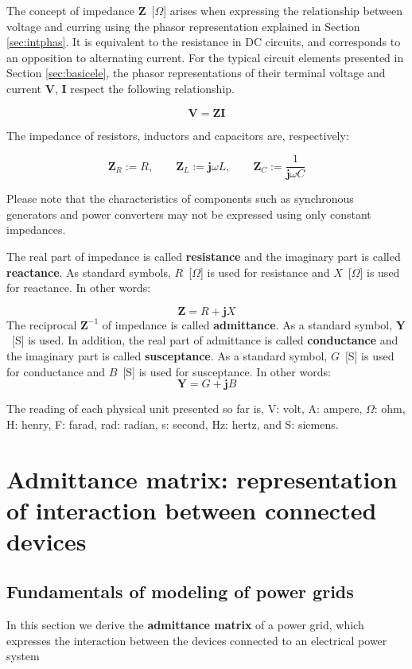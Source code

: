 \documentclass[graybox, envcountchap]{svmult}
\begin{document}
The concept of impedance $\bm{Z}$~[$\Omega$] arises when expressing the
relationship between voltage and curring using the phasor representation
explained in Section \ref{sec:intphas}. It is equivalent to the resistance in DC
circuits, and corresponds to an opposition to alternating current. For the
typical circuit elements presented in Section \ref{sec:basicele}, the phasor
representations of their terminal voltage and current $\bm{V}$, $\bm{I}$ respect
the following relationship.

\begin{equation}
  \bm{V} = \bm{Z}\bm{I}
\end{equation}

The impedance of resistors, inductors and capacitors are, respectively:

\[
  \bm{Z}_{R}:=R,\qquad
  \bm{Z}_{L}:=\bm{j}\omega L,\qquad
  \bm{Z}_{C}:=\frac{1}{\bm{j}\omega C}
\]

Please note that the characteristics of components such as synchronous
generators and power converters may not be expressed using only constant
impedances.

The real part of impedance is called \textbf{resistance} and the imaginary part
is called \textbf{reactance}. As standard symbols, $R$~[$\Omega$] is used for
resistance and $X$~[$\Omega$] is used for reactance. In other words:

\[
  \bm{Z} = R + \bm{j} X
\]
The reciprocal $\bm{Z}^{-1}$ of impedance is called \textbf{admittance}.
As a standard symbol, $\bm{Y}$~[S] is used.
In addition, the real part of admittance is called \textbf{conductance} and the imaginary part is called \textbf{susceptance}.
As a standard symbol, $G$~[S] is used for conductance and $B$~[S] is used for susceptance.
In other words:
\[
\bm{Y} = G + \bm{j} B
\]

The reading of each physical unit presented so far is, V: volt, A: ampere,
$\Omega$: ohm, H: henry, F: farad, rad: radian, s: second, Hz: hertz, and S:
siemens.

\section{Admittance matrix: representation of interaction between connected
devices}\label{sec:transadm}

\subsection{Fundamentals of modeling of power grids}
In this section we derive the \textbf{admittance matrix} of a power grid, which
expresses the interaction between the devices connected to an electrical power
system 
\end{document}
